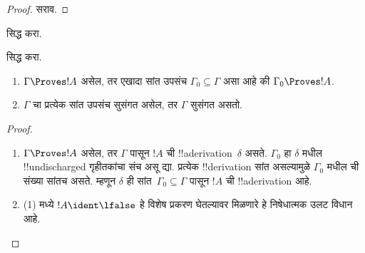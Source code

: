 \documentclass[../../../include/open-logic-section]{subfiles}
\begin{document}
\begin{proof}
सराव.
\end{proof}

\begin{prob}
 सिद्ध करा.
\end{prob}
\tagendprob

\begin{prob}
 सिद्ध करा.
\end{prob}
\tagendprob

\begin{prop}[संहतता]
  \begin{enumerate}
  \item $\Gamma \Proves !A$ असेल, तर एखादा सांत उपसंच $\Gamma_0
    \subseteq \Gamma$ असा आहे की $\Gamma_0 \Proves !A$.
  \item $\Gamma$ चा प्रत्येक सांत उपसंच सुसंगत असेल, तर $\Gamma$ सुसंगत
    असतो.
  \end{enumerate}
\end{prop}

\begin{proof}
  \begin{enumerate}
    \item $\Gamma \Proves !A$ असेल, तर $\Gamma$ पासून $!A$ ची
      !!a{derivation}~$\delta$ असते. $\Gamma_0$ हा $\delta$ मधील
      !!{undischarged} गृहीतकांचा संच असू द्या. प्रत्येक !!{derivation} सांत
      असल्यामुळे $\Gamma_0$ मधील ची संख्या सांतच असते.
      म्हणून $\delta$ ही सांत~$\Gamma_0 \subseteq \Gamma$ पासून $!A$ ची
      !!a{derivation} आहे.
    \item (1) मध्ये $!A
      \ident \lfalse$ हे विशेष प्रकरण घेतल्यावर मिळणारे हे निषेधात्मक उलट
      विधान आहे.
  \end{enumerate}
\end{proof}
\end{document}
